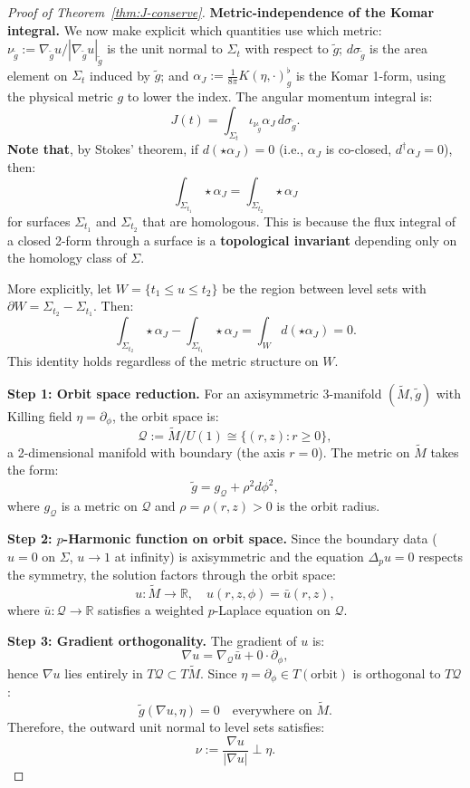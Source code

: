 \documentclass[10pt,a4paper]{amsart}
\newcommand{\tM}{\tilde{M}}
\newcommand{\tg}{\tilde{g}}
\begin{document}
\begin{proof}[Proof of Theorem~\ref{thm:J-conserve}]
\textbf{Metric-independence of the Komar integral.} We now make explicit which quantities use which metric: $\nu_{\tg} := \nabla_{\tg} u / |\nabla_{\tg} u|_{\tg}$ is the unit normal to $\Sigma_t$ with respect to $\tg$; $d\sigma_{\tg}$ is the area element on $\Sigma_t$ induced by $\tg$; and $\alpha_J := \frac{1}{8\pi} K(\eta, \cdot)^\flat_g$ is the Komar 1-form, using the physical metric $g$ to lower the index. The angular momentum integral is:
\[
J(t) = \int_{\Sigma_t} \iota_{\nu_{\tg}} \alpha_J \, d\sigma_{\tg}.
\]
\textbf{Note that}, by Stokes' theorem, if $d(\star\alpha_J) = 0$ (i.e., $\alpha_J$ is co-closed, $d^\dagger\alpha_J = 0$), then:
\[
\int_{\Sigma_{t_1}} \star\alpha_J  = \int_{\Sigma_{t_2}} \star\alpha_J
\]
for surfaces $\Sigma_{t_1}$ and $\Sigma_{t_2}$ that are homologous. This is because the flux integral of a closed 2-form through a surface is a \textbf{topological invariant} depending only on the homology class of $\Sigma$.

More explicitly, let $W = \{t_1 \leq u \leq t_2\}$ be the region between level sets with $\partial W = \Sigma_{t_2} - \Sigma_{t_1}$. Then:
\[
\int_{\Sigma_{t_2}} \star\alpha_J - \int_{\Sigma_{t_1}} \star\alpha_J = \int_W d(\star\alpha_J) = 0.
\]
This identity holds regardless of the metric structure on $W$.

\textbf{Step 1: Orbit space reduction.}
For an axisymmetric 3-manifold $(\tM, \tg)$ with Killing field $\eta = \partial_\phi$, the orbit space is:
\[
\mathcal{Q} := \tM / U(1) \cong \{(r, z) : r \geq 0\},
\]
a 2-dimensional manifold with boundary (the axis $r = 0$). The metric on $\tM$ takes the form:
\[
\tg = g_{\mathcal{Q}} + \rho^2 d\phi^2,
\]
where $g_{\mathcal{Q}}$ is a metric on $\mathcal{Q}$ and $\rho = \rho(r, z) > 0$ is the orbit radius.

\textbf{Step 2: $p$-Harmonic function on orbit space.}
Since the boundary data ($u = 0$ on $\Sigma$, $u \to 1$ at infinity) is axisymmetric and the equation $\Delta_p u = 0$ respects the symmetry, the solution factors through the orbit space:
\[
u: \tM \to \mathbb{R}, \quad u(r, z, \phi) = \bar{u}(r, z),
\]
where $\bar{u}: \mathcal{Q} \to \mathbb{R}$ satisfies a weighted $p$-Laplace equation on $\mathcal{Q}$.

\textbf{Step 3: Gradient orthogonality.}
The gradient of $u$ is:
\[
\nabla u = \nabla_{\mathcal{Q}} \bar{u} + 0 \cdot \partial_\phi,
\]
hence $\nabla u$ lies entirely in $T\mathcal{Q} \subset T\tM$. Since $\eta = \partial_\phi \in T(\text{orbit})$ is orthogonal to $T\mathcal{Q}$:
\[
\tg(\nabla u, \eta) = 0 \quad \text{everywhere on } \tM.
\]
Therefore, the outward unit normal to level sets satisfies:
\[
\nu := \frac{\nabla u}{|\nabla u|} \perp \eta.
\]


\end{proof}
\end{document}
